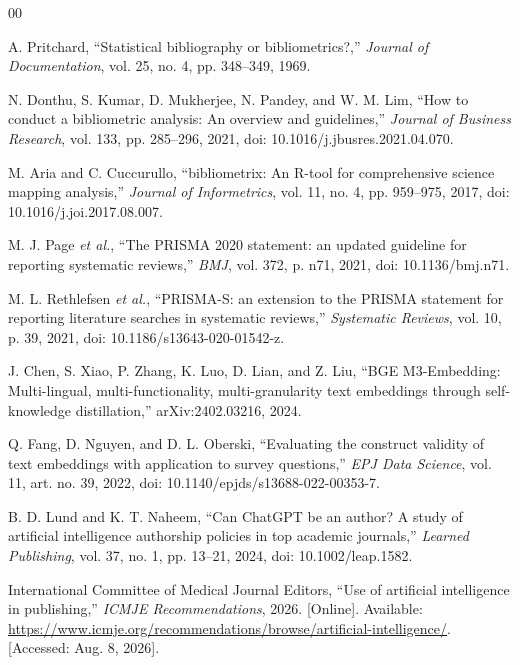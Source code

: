 \documentclass[a4paper,10pt,conference]{IEEEtran}
\begin{document}
\IEEEtriggercmd{\enlargethispage{-1.5in}}
\begin{thebibliography}{00}

A. Pritchard, ``Statistical bibliography or bibliometrics?,'' \emph{Journal of
Documentation}, vol. 25, no. 4, pp. 348--349, 1969.

N. Donthu, S. Kumar, D. Mukherjee, N. Pandey, and W. M. Lim, ``How to conduct a
bibliometric analysis: An overview and guidelines,'' \emph{Journal of Business
Research}, vol. 133, pp. 285--296, 2021, doi: 10.1016/j.jbusres.2021.04.070.

M. Aria and C. Cuccurullo, ``bibliometrix: An R-tool for comprehensive science
mapping analysis,'' \emph{Journal of Informetrics}, vol. 11, no. 4, pp.
959--975, 2017, doi: 10.1016/j.joi.2017.08.007.

M. J. Page \emph{et al.}, ``The PRISMA 2020 statement: an updated guideline
for reporting systematic reviews,'' \emph{BMJ}, vol. 372, p. n71, 2021,
doi: 10.1136/bmj.n71.

M. L. Rethlefsen \emph{et al.}, ``PRISMA-S: an extension to the PRISMA
statement for reporting literature searches in systematic reviews,''
\emph{Systematic Reviews}, vol. 10, p. 39, 2021,
doi: 10.1186/s13643-020-01542-z.

J. Chen, S. Xiao, P. Zhang, K. Luo, D. Lian, and Z. Liu, ``BGE M3-Embedding:
Multi-lingual, multi-functionality, multi-granularity text embeddings through
self-knowledge distillation,'' arXiv:2402.03216, 2024.

Q. Fang, D. Nguyen, and D. L. Oberski, ``Evaluating the construct validity of
text embeddings with application to survey questions,'' \emph{EPJ Data Science},
vol. 11, art. no. 39, 2022, doi: 10.1140/epjds/s13688-022-00353-7.

B. D. Lund and K. T. Naheem, ``Can ChatGPT be an author? A study of artificial
intelligence authorship policies in top academic journals,'' \emph{Learned
Publishing}, vol. 37, no. 1, pp. 13--21, 2024,
doi: 10.1002/leap.1582.

International Committee of Medical Journal Editors, ``Use of artificial
intelligence in publishing,'' \emph{ICMJE Recommendations}, 2026. [Online].
Available: \url{https://www.icmje.org/recommendations/browse/artificial-intelligence/}.
[Accessed: Aug. 8, 2026].


\end{thebibliography}
\end{document}
